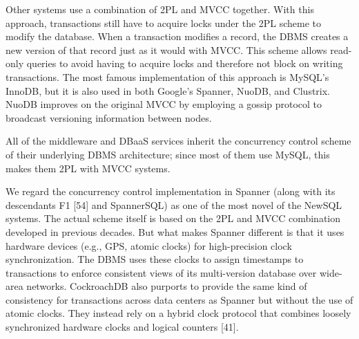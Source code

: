 \documentclass[a4paper,11pt,twoside,openright]{article}
\begin{document}
Other systems use a combination of 2PL and MVCC together. With this
approach, transactions still have to acquire locks under the 2PL scheme
to modify the database. When a transaction modifies a record, the DBMS
creates a new version of that record just as it would with MVCC. This
scheme allows read-only queries to avoid having to acquire locks and
therefore not block on writing transactions. The most famous
implementation of this approach is MySQL's InnoDB, but it is also used
in both Google's Spanner, NuoDB, and Clustrix. NuoDB improves on the
original MVCC by employing a gossip protocol to broadcast versioning
information between nodes.

All of the middleware and DBaaS services inherit the concurrency control
scheme of their underlying DBMS architecture; since most of them use
MySQL, this makes them 2PL with MVCC systems.

We regard the concurrency control implementation in Spanner (along with
its descendants F1 {[}54{]} and SpannerSQL) as one of the most novel of
the NewSQL systems. The actual scheme itself is based on the 2PL and
MVCC combination developed in previous decades. But what makes Spanner
different is that it uses hardware devices (e.g., GPS, atomic clocks)
for high-precision clock synchronization. The DBMS uses these clocks to
assign timestamps to transactions to enforce consistent views of its
multi-version database over wide-area networks. CockroachDB also
purports to provide the same kind of consistency for transactions across
data centers as Spanner but without the use of atomic clocks. They
instead rely on a hybrid clock protocol that combines loosely
synchronized hardware clocks and logical counters {[}41{]}.
\end{document}
